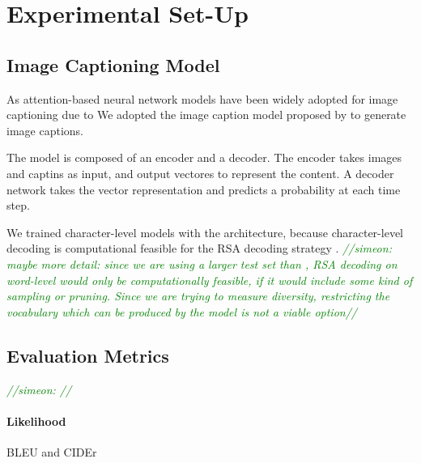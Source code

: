 \documentclass[11pt,a4paper]{article}
\newcommand{\sina}[1]{\textcolor{blue}{\emph{//sina: #1//}}}
\newcommand{\simeon}[1]{\textcolor{green}{\emph{//simeon: #1//}}}
\begin{document}
\section{Experimental Set-Up}


\subsection{Image Captioning Model}
As attention-based neural network models have been widely adopted for image captioning due to We adopted the image caption model proposed by \citet{Lu2017Adaptive} to generate image captions. 


The model is composed of an encoder and a decoder. The encoder takes images and captins as input, and output vectores to represent the content. A decoder network takes the vector representation and predicts a probability at each time step.

 
 We trained character-level models with the architecture, because character-level decoding is computational feasible for the RSA decoding strategy \citep{Cohn-Gordon2018}. \simeon{maybe more detail: since we are using a larger test set than \citep[2]{Cohn-Gordon2018}, RSA decoding on word-level would only be computationally feasible, if it would include some kind of sampling or pruning. Since we are trying to measure diversity, restricting the vocabulary which can be produced by the model is not a viable option}
 

 





\subsection{Evaluation Metrics}
\simeon{}

\paragraph{Likelihood} BLEU \citep{papineni-etal-2002-bleu} and CIDEr \citep{Vedantam2014}
\end{document}
